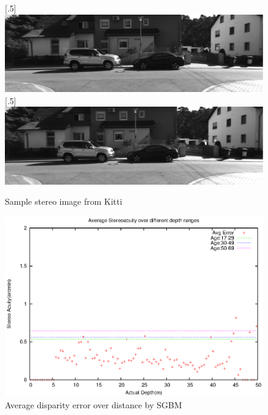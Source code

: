 \begin{figure}[h!]
\centering
{}
[.5\linewidth]{\includegraphics[scale=0.21]{000005L}}%
[.5\linewidth]{\includegraphics[scale=0.21]{000005R}}%
\caption{Sample stereo image from Kitti}
\label{fig:img5}
\end{figure}

\begin{figure}[H]
\centering
\includegraphics[scale=0.8]{sgbmimg5pix3msk}
\caption{Average disparity error over distance by SGBM}
\label{fig:imgmsk5}
\end{figure} 

